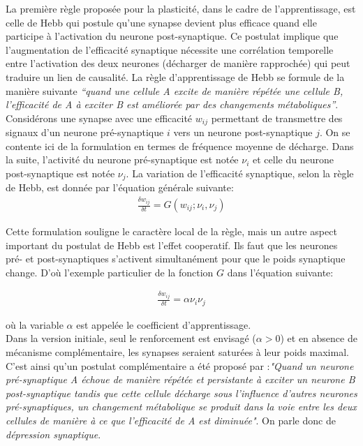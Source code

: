 La première règle proposée pour la plasticité, dans le cadre de l'apprentissage, est celle de Hebb \cite{Hebb:1949, Gerstner:2002} qui postule qu'une synapse devient plus efficace quand elle participe à l'activation du neurone post-synaptique. Ce postulat implique que l'augmentation de l'efficacité synaptique nécessite une corrélation temporelle entre l'activation des deux neurones (décharger de manière rapprochée) qui peut traduire un lien de causalité. La règle d'apprentissage de Hebb se formule de la manière suivante \textit{``quand une cellule A excite de manière répétée une cellule B, l'efficacité de A à exciter B est améliorée par des changements métaboliques''}. Considérons une synapse avec une efficacité $w_{ij}$ permettant de transmettre des signaux d'un neurone pré-synaptique $i$ vers un neurone post-synaptique $j$. On se contente ici de la formulation en termes de fréquence moyenne de décharge. Dans la suite, l'activité du neurone pré-synaptique est notée $\nu_i$ et celle du neurone post-synaptique est notée $\nu_j$. La variation de l'efficacité synaptique, selon la règle de Hebb, est donnée par l'équation générale suivante:\\

\begin{align}
\frac{\delta w_{ij}}{\delta t}=G(w_{ij};\nu_i,\nu_j)
\end{align}

Cette formulation souligne le caractère local de la règle, mais un autre aspect important du postulat de Hebb est l'effet cooperatif. Ils faut que les neurones pré- et post-synaptiques s'activent simultanément pour que le poids synaptique change. D'o\`u l'exemple particulier de la fonction $G$ dans l'équation suivante:

\begin{align}
\frac{\delta w_{ij}}{\delta t}=\alpha \nu_i \nu_j
\end{align}

 où la variable $\alpha$ est appelée le coefficient d'apprentissage.\\

Dans la version initiale, seul le renforcement est envisagé ($\alpha >0$) et en absence de mécanisme complémentaire, les synapses seraient saturées à leur poids maximal. C'est ainsi qu'un postulat complémentaire a été proposé par \cite{Stent:1973}:\textit{"Quand un neurone pré-synaptique A échoue de manière répétée et persistante à exciter un neurone B post-synaptique tandis que cette cellule décharge sous l'influence d'autres neurones pré-synaptiques, un changement métabolique se produit dans la voie entre les deux cellules de manière à ce que l'efficacité de A est diminuée"}. On parle donc de \textit{dépression synaptique}.\\


